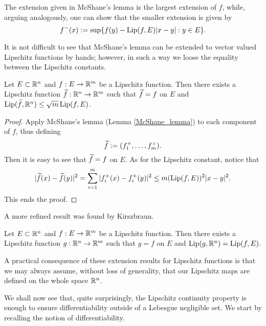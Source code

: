 \begin{remark} The extension given in McShane's lemma is the largest extension of $f$, while, arguing analogously, one can show that the smaller extension is given by
\begin{equation*}
f^{-}(x) := \sup \{ f(y) - \operatorname{Lip}(f, E) |x - y| : y \in E \}.
\end{equation*}
\end{remark}

It is not difficult to see that McShane's lemma can be extended to vector valued Lipschitz functions by hands; however, in such a way we loose the equality between the Lipschitz constants.

\begin{corollary}
Let $E \subset \mathbb{R}^{n}$ and $f: E \to \mathbb{R}^{m}$ be a Lipschitz function. Then there exists a Lipschitz function $\widetilde{ f} : \mathbb{R}^{n} \to \mathbb{R}^{m}$ such that $\widetilde{ f} = f$ on $E$ and $\operatorname{Lip}(\widetilde{ f}, \mathbb{R}^{n}) \le \sqrt{m} \operatorname{Lip}(f, E)$.
\end{corollary}
\begin{proof}
Apply McShane's lemma (Lemma \ref{McShane_lemma}) to each component of $f$, thus defining
\begin{equation*}
\widetilde{ f} := (f_{1}^{+}, \dots, f_{m}^{+}).
\end{equation*}
Then it is easy to see that $\widetilde{ f}= f$ on $E$. As for the Lipschitz constant, notice that
\begin{equation*}
|\widetilde{ f}(x) - \widetilde{ f}(y)|^{2} = \sum_{i = 1}^{m}|f_{i}^{+}(x) - f_{i}^{+}(y)|^{2} \le m (\operatorname{Lip}(f, E))^{2} |x - y|^2.
\end{equation*}
This ends the proof.
\end{proof}

A more refined result was found by Kirszbraun.

\begin{theorem}
Let $E \subset \mathbb{R}^{n}$ and $f: E \to \mathbb{R}^{m}$ be a Lipschitz function. Then there exists a Lipschitz function $g: \mathbb{R}^{n} \to \mathbb{R}^{m}$ such that $g = f$ on $E$ and $\operatorname{Lip}(g, \mathbb{R}^{n}) = \operatorname{Lip}(f, E)$.
\end{theorem}

A practical consequence of these extension results for Lipschitz functions is that we may always assume, without loss of generality, that our Lipschitz maps are defined on the whole space $\mathbb{R}^{n}$.

We shall now see that, quite surprisingly, the Lipschitz continuity property is enough to ensure differentiability outside of a Lebesgue negligible set. We start by recalling the notion of differentiability.


